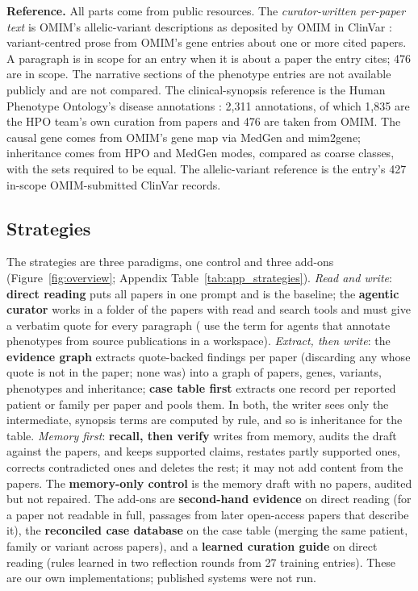 \documentclass{article} %
\begin{document}
\textbf{Reference.} All parts come from public resources. The \emph{curator-written per-paper text} is OMIM's allelic-variant descriptions as deposited by OMIM in ClinVar \citep{landrum2025clinvar}: variant-centred prose from OMIM's gene entries about one or more cited papers. A paragraph is in scope for an entry when it is about a paper the entry cites; 476 are in scope. The narrative sections of the phenotype entries are not available publicly and are not compared. The clinical-synopsis reference is the Human Phenotype Ontology's disease annotations \citep{gargano2024human}: 2,311 annotations, of which 1,835 are the HPO team's own curation from papers and 476 are taken from OMIM. The causal gene comes from OMIM's gene map via MedGen \citep{Louden2020MedgenNcbis} and mim2gene; inheritance comes from HPO and MedGen modes, compared as coarse classes, with the sets required to be equal. The allelic-variant reference is the entry's 427 in-scope OMIM-submitted ClinVar records.

\subsection{Strategies}
\label{sec:strategies}
The strategies are three paradigms, one control and three add-ons (Figure~\ref{fig:overview}; Appendix Table~\ref{tab:app_strategies}). \emph{Read and write}: \textbf{direct reading} puts all papers in one prompt and is the baseline; the \textbf{agentic curator} works in a folder of the papers with read and search tools and must give a verbatim quote for every paragraph (\citealp{balhoff2026frontier} use the term for agents that annotate phenotypes from source publications in a workspace). \emph{Extract, then write}: the \textbf{evidence graph} extracts quote-backed findings per paper (discarding any whose quote is not in the paper; none was) into a graph of papers, genes, variants, phenotypes and inheritance; \textbf{case table first} extracts one record per reported patient or family per paper and pools them. In both, the writer sees only the intermediate, synopsis terms are computed by rule, and so is inheritance for the table. \emph{Memory first}: \textbf{recall, then verify} writes from memory, audits the draft against the papers, and keeps supported claims, restates partly supported ones, corrects contradicted ones and deletes the rest; it may not add content from the papers. The \textbf{memory-only control} is the memory draft with no papers, audited but not repaired. The add-ons are \textbf{second-hand evidence} on direct reading (for a paper not readable in full, passages from later open-access papers that describe it), the \textbf{reconciled case database} on the case table (merging the same patient, family or variant across papers), and a \textbf{learned curation guide} on direct reading (rules learned in two reflection rounds from 27 training entries). These are our own implementations; published systems were not run.
\end{document}
